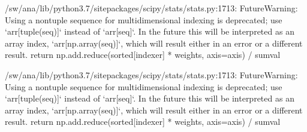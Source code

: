 \documentclass[letterpaper,10pt,english]{sphinxhowto}
\begin{document}

%
\begin{sphinxVerbatim}[commandchars=\\\{\}]

 
       
\end{sphinxVerbatim}

%
\begin{sphinxVerbatim}[commandchars=\\\{\}]
/sw/ana/lib/python3.7/site\PYGZhy{}packages/scipy/stats/stats.py:1713: FutureWarning: Using a non\PYGZhy{}tuple sequence for multidimensional indexing is deprecated; use {}`arr[tuple(seq)]{}` instead of {}`arr[seq]{}`. In the future this will be interpreted as an array index, {}`arr[np.array(seq)]{}`, which will result either in an error or a different result.
  return np.add.reduce(sorted[indexer] * weights, axis=axis) / sumval
\end{sphinxVerbatim}


%
\begin{sphinxVerbatim}[commandchars=\\\{\}]

 
       
\end{sphinxVerbatim}

%
\begin{sphinxVerbatim}[commandchars=\\\{\}]
/sw/ana/lib/python3.7/site\PYGZhy{}packages/scipy/stats/stats.py:1713: FutureWarning: Using a non\PYGZhy{}tuple sequence for multidimensional indexing is deprecated; use {}`arr[tuple(seq)]{}` instead of {}`arr[seq]{}`. In the future this will be interpreted as an array index, {}`arr[np.array(seq)]{}`, which will result either in an error or a different result.
  return np.add.reduce(sorted[indexer] * weights, axis=axis) / sumval
\end{sphinxVerbatim}
\end{document}
